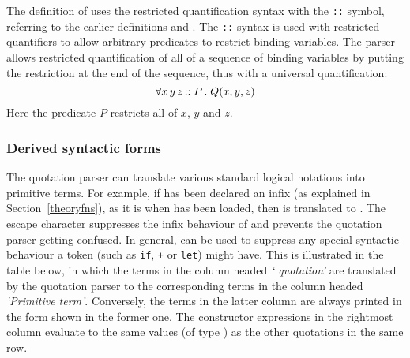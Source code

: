 The definition of  uses the restricted
quantification syntax with the {\small\verb+::+} symbol, referring to
the earlier definitions  and .
The \texttt{::} syntax is used with restricted quantifiers to allow
arbitrary predicates to restrict binding variables. The \HOL{} parser
allows restricted quantification of all of a sequence of binding
variables by putting the restriction at the end of the sequence, thus
with a universal quantification:
%
\[
\forall x \, y \, z \, {\tt ::} \; P \, . \; Q(x,y,z)
\]
%
Here the predicate $P$ restricts all of $x$, $y$ and $z$.

\subsubsection{Derived syntactic forms}\label{derived-terms}

The \HOL{} quotation parser
%
%
can translate various standard logical
notations
%
%
into primitive terms. For example, if \ml{+} has been declared an
infix
%
%
(as explained in Section~\ref{theoryfns}), as it is when
 has been loaded, then  is
translated to . The escape character \ml{\$}
%
%
suppresses the infix behaviour of \ml{+} and prevents the quotation
parser getting confused.  In general, \ml{\$} can be used to suppress
any special syntactic behaviour a token (such as \texttt{if},
\texttt{+} or \texttt{let})
%
%
might have. This is illustrated in the table below, in which the terms
in the column headed \textit{`\ML{} quotation'} are translated by the
quotation parser to the corresponding terms in the column headed
\textit{`Primitive term'}.  Conversely, the terms in the latter column
are always printed in the form shown in the former one.  The \ML{}
constructor expressions in the rightmost column evaluate to the same
values (of type ) as the other quotations in the same row.


